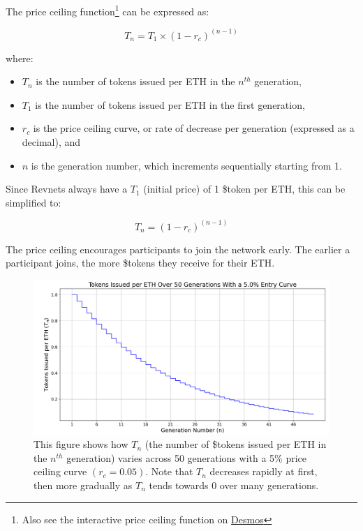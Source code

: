 \documentclass{article}
\begin{document}
The price ceiling function\footnote{Also see the interactive price ceiling function on \href{https://www.desmos.com/calculator/ey9fhuslwe}{Desmos}} can be expressed as:

\begin{equation}
  T_n = T_1 \times (1 - r_c)^{(n - 1)}
\end{equation}

where:
\begin{itemize}
  \item $T_n$ is the number of tokens issued per ETH in the $n^{th}$ generation,
  \item $T_1$ is the number of tokens issued per ETH in the first generation,
  \item $r_c$ is the price ceiling curve, or rate of decrease per generation (expressed as a decimal), and
  \item $n$ is the generation number, which increments sequentially starting from 1.
\end{itemize}

Since Revnets always have a $T_1$ (initial price) of 1 \$token per ETH, this can be simplified to:

\begin{equation}
  T_n = (1 - r_c)^{(n - 1)}
\end{equation}

The price ceiling encourages participants to join the network early. The earlier a participant joins, the more \$tokens they receive for their ETH.

\begin{figure}[h]
  \centering
  \includegraphics[width=\textwidth]{figures/single-entry-curve.png}
   \caption{This figure shows how $T_n$ (the number of \$tokens issued per ETH in the $n^{th}$ generation) varies across 50 generations with a 5\% price ceiling curve $(r_c = 0.05)$. Note that $T_n$ decreases rapidly at first, then more gradually as $T_n$ tends towards 0 over many generations.}
\end{figure}
\end{document}
